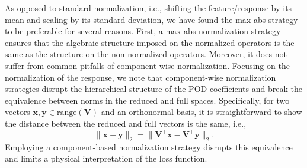 \documentclass[3p,computermodern,11pt]{elsarticle}
\numberwithin{equation}{section}
\newcommand{\range}[1]{\mathrm{range}\left(#1\right)}
\newcommand{\romBasis}{\mathbf{V}}
\newcommand{\RR}[1]{\mathbb{R}^{#1}}
\begin{document}
As opposed to standard normalization, i.e., shifting the feature/response by its mean and scaling by its standard deviation, we have found the max-abs strategy to be preferable for several reasons.
First, a max-abs normalization strategy ensures that the algebraic structure imposed on the normalized operators is the same as the structure on the non-normalized operators.  Moreover, it does not suffer from common pitfalls of component-wise normalization.
Focusing on the normalization of the response, we note that component-wise normalization strategies disrupt the hierarchical structure of the POD coefficients and break the equivalence between norms in the reduced and full spaces. Specifically, for two vectors $\mathbf{x}, \mathbf{y} \in \range{\romBasis}$ and an orthonormal basis, it is straightforward to show 
the distance between the reduced  and full vectors is the same, i.e.,  
$$\|\mathbf{x} - \mathbf{y} \|_2 = \big\|\romBasis^\intercal \mathbf{x} - \romBasis^\intercal \mathbf{y} \big\|_2.$$
Employing a component-based normalization strategy disrupts this equivalence and limits a physical interpretation of the loss function. 


 
\end{document}
